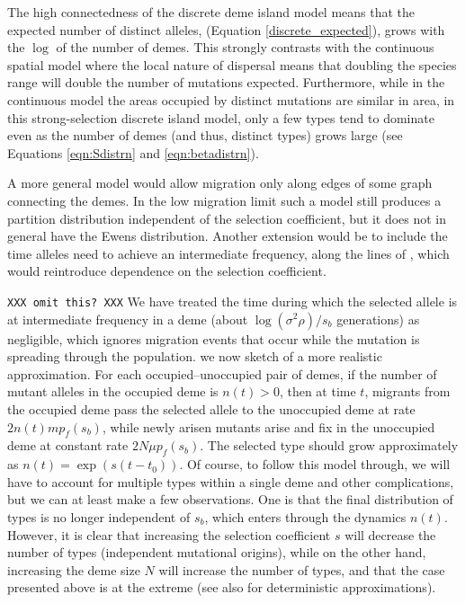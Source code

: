 \documentclass{article}
\begin{document}

The high connectedness of the discrete deme island model means that the expected number of distinct alleles, (Equation \eqref{discrete_expected}), 
grows with the $\log$ of the number of demes. This strongly contrasts with the continuous spatial model where the local nature of dispersal means that doubling the species range will double the number of mutations expected. 
Furthermore, while in the continuous model the areas occupied by distinct mutations are similar in area, in this strong-selection discrete island model, 
only a few types tend to dominate even as the number of demes (and thus, distinct types) grows large (see Equations \eqref{eqn:Sdistrn} and \eqref{eqn:betadistrn}).

A more general model would allow migration only along edges of some graph connecting the demes.
In the low migration limit such a model still produces a partition distribution independent of the selection coefficient,
but it does not in general have the Ewens distribution.
Another extension would be to include the time alleles need to achieve an intermediate frequency,
along the lines of \citet{Navarro:03}, which would reintroduce dependence on the selection coefficient.

\texttt{XXX omit this? XXX}
We have treated the time during which the selected allele is at intermediate frequency in a deme (about $\log(\sigma^2 \rho)/s_b$ generations) as negligible, 
which ignores migration events that occur while the mutation is spreading through the population. 
we now sketch of a more realistic approximation.
For each occupied--unoccupied pair of demes, if the number of mutant alleles in the occupied deme is $n(t)>0$,
then at time $t$, migrants from the occupied deme pass the selected allele to the unoccupied deme at rate $2 n(t) m p_f(s_b)$,
while newly arisen mutants arise and fix in the unoccupied deme at constant rate $2 N \mu p_f(s_b)$.
The selected type should grow approximately as $n(t)=\exp(s(t-t_0))$.
Of course, to follow this model through, we will have to account for multiple types within a single deme and other complications,
but we can at least make a few observations.
One is that the final distribution of types is no longer independent of $s_b$, which enters through the dynamics $n(t)$.
However, it is clear that increasing the selection coefficient $s$ will decrease the number of types (independent mutational origins),
while on the other hand, increasing the deme size $N$ will increase the number of types,
and that the case presented above is at the extreme (see also \cite{Navarro:03} for deterministic approximations). 
\end{document}
